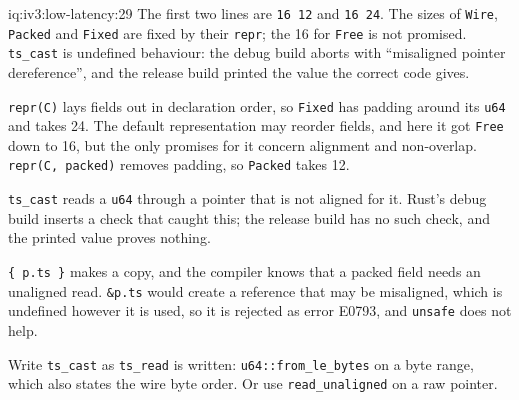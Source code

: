 \begin{solution}{iq:iv3:low-latency:29}
The first two lines are \texttt{16 12} and \texttt{16 24}. The sizes of \texttt{Wire}, \texttt{Packed} and \texttt{Fixed} are fixed by their \texttt{repr}; the 16 for \texttt{Free} is not promised. \texttt{ts\_cast} is undefined behaviour: the debug build aborts with ``misaligned pointer dereference'', and the release build printed the value the correct code gives.

\texttt{repr(C)} lays fields out in declaration order, so \texttt{Fixed} has padding around its \texttt{u64} and takes 24. The default representation may reorder fields, and here it got \texttt{Free} down to 16, but the only promises for it concern alignment and non-overlap. \texttt{repr(C, packed)} removes padding, so \texttt{Packed} takes 12.

\texttt{ts\_cast} reads a \texttt{u64} through a pointer that is not aligned for it. Rust's debug build inserts a check that caught this; the release build has no such check, and the printed value proves nothing.

\texttt{\{ p.ts \}} makes a copy, and the compiler knows that a packed field needs an unaligned read. \texttt{\&p.ts} would create a reference that may be misaligned, which is undefined however it is used, so it is rejected as error E0793, and \texttt{unsafe} does not help.

Write \texttt{ts\_cast} as \texttt{ts\_read} is written: \texttt{u64::from\_le\_bytes} on a byte range, which also states the wire byte order. Or use \texttt{read\_unaligned} on a raw pointer.

\end{solution}

